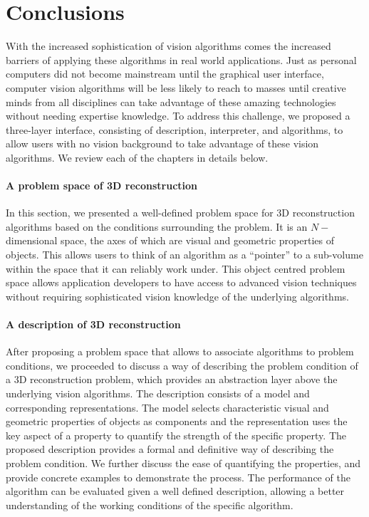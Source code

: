 
\chapter{Conclusions}
\label{ch:conclusion}
With the increased sophistication of vision algorithms comes the increased barriers of applying these algorithms in real world applications. Just as personal computers did not become mainstream until the graphical user interface, computer vision algorithms will be less likely to reach to masses until creative minds from all disciplines can take advantage of these amazing technologies without needing expertise knowledge. To address this challenge, we proposed a three-layer interface, consisting of description, interpreter, and algorithms, to allow users with no vision background to take advantage of these vision algorithms. We review each of the chapters in details below.

\subsubsection{A problem space of 3D reconstruction}
In this section, we presented a well-defined problem space for 3D reconstruction algorithms based on the conditions surrounding the problem. It is an $N-$dimensional space, the axes of which are visual and geometric properties of objects. This allows users to think of an algorithm as a ``pointer'' to a sub-volume within the space that it can reliably work under. This object centred problem space allows application developers to have access to advanced vision techniques without requiring sophisticated vision knowledge of the underlying algorithms.

\subsubsection{A description of 3D reconstruction}
After proposing a problem space that allows to associate algorithms to problem conditions, we proceeded to discuss a way of describing the problem condition of a 3D reconstruction problem, which provides an abstraction layer above the underlying vision algorithms. The description consists of a model and corresponding representations. The model selects characteristic visual and geometric properties of objects as components and the representation uses the key aspect of a property to quantify the strength of the specific property. The proposed description provides a formal and definitive way of describing the problem condition. We further discuss the ease of quantifying the properties, and provide concrete examples to demonstrate the process. The performance of the algorithm can be evaluated given a well defined description, allowing a better understanding of the working conditions of the specific algorithm.

